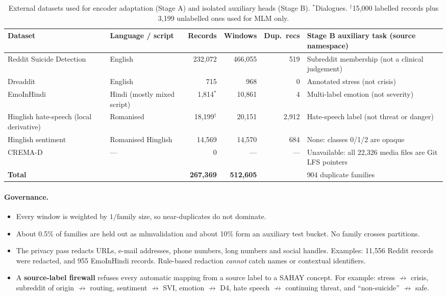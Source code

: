 \documentclass[11pt,a4paper]{article}
\newcommand{\codeus}{\textunderscore\allowbreak}
\DeclareRobustCommand{\code}[1]{{\ttfamily\let\_\codeus #1}}
\begin{document}
\begin{table}[!htbp]
\centering\footnotesize
\caption{External datasets used for encoder adaptation (Stage A) and isolated auxiliary heads (Stage B).
$^{\ast}$Dialogues. $^{\dagger}$15{,}000 labelled records plus 3{,}199 unlabelled ones used for MLM only.}
\label{tab:ext}
\begin{tabularx}{\linewidth}{@{}>{\raggedright\arraybackslash}p{3.3cm}>{\raggedright\arraybackslash}p{2.2cm}rrr>{\raggedright\arraybackslash}X@{}}
\toprule
Dataset & Language / script & Records & Windows & Dup.\ recs & Stage B auxiliary task (source namespace) \\
\midrule
Reddit Suicide Detection & English & 232{,}072 & 466{,}055 & 519 & Subreddit membership (not a clinical judgement) \\
Dreaddit & English & 715 & 968 & 0 & Annotated stress (not crisis) \\
EmoInHindi~\cite{singh2022} & Hindi (mostly mixed script) & 1{,}814$^{\ast}$ & 10{,}861 & 4 & Multi-label emotion (not severity) \\
Hinglish hate-speech (local derivative) & Romanised & 18{,}199$^{\dagger}$ & 20{,}151 & 2{,}912 & Hate-speech label (not threat or danger) \\
Hinglish sentiment & Romanised Hinglish & 14{,}569 & 14{,}570 & 684 & None: classes 0/1/2 are opaque \\
CREMA-D & --- & 0 & --- & --- & Unavailable: all 22{,}326 media files are Git LFS pointers \\
\midrule
\textbf{Total} & & \textbf{267{,}369} & \textbf{512{,}605} & & 263{,}904 duplicate families \\
\bottomrule
\end{tabularx}
\end{table}

\paragraph{Governance.}
\begin{itemize}
  \item Every window is weighted by $1/\text{family size}$, so near-duplicates do not dominate.
  \item About 0.5\% of families are held out as \code{mlm\_validation} and about 10\% form an
        auxiliary test bucket. No family crosses partitions.
  \item The privacy pass redacts URLs, e-mail addresses, phone numbers, long numbers and social
        handles. Examples: 11{,}556 Reddit records were redacted, and 955 EmoInHindi records.
        Rule-based redaction \emph{cannot} catch names or contextual identifiers.
  \item A \textbf{source-label firewall} refuses every automatic mapping from a source label to a
        SAHAY concept. For example: stress $\not\to$ crisis, subreddit of origin $\not\to$ routing,
        sentiment $\not\to$ SVI, emotion $\not\to$ D4, hate speech $\not\to$ continuing threat,
        and ``non-suicide'' $\not\to$ safe.
\end{itemize}
\end{document}
